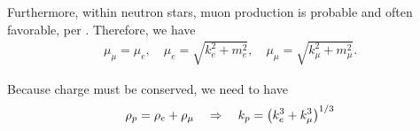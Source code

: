 Furthermore, within neutron stars, muon production is probable and often favorable, per \autocite[p. 90]{diener_2008}. Therefore, we have
\begin{align}
    \mu_\mu = \mu_e,\quad \mu_e  = \sqrt{k_e^2 + m_e^2}, \quad \mu_\mu  = \sqrt{k_\mu^2 + m_\mu^2}.
\end{align}

Because charge must be conserved, we need to have
\begin{align}
    \rho_p = \rho_e + \rho_\mu \goesto k_p = \pqty{k_e^3 + k_\mu^3}^{1/3}
\end{align}
